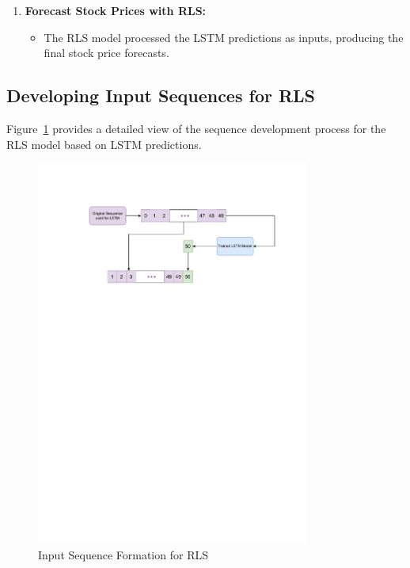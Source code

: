 \begin{enumerate}
    \item \textbf{Forecast Stock Prices with RLS:}
    \begin{itemize}
        \item The RLS model processed the LSTM predictions as inputs, producing the final stock price forecasts.
    \end{itemize}
    
\end{enumerate}

\subsection{Developing Input Sequences for RLS}

Figure~\ref{fig:inputseq} provides a detailed view of the sequence development process for the RLS model based on LSTM predictions.

\begin{figure}[htbp]
    \centering
    \includegraphics[width=0.8\textwidth]{Images/RLSInputCreation.pdf} %
    \caption{Input Sequence Formation for RLS}
    \label{fig:inputseq}
\end{figure}

